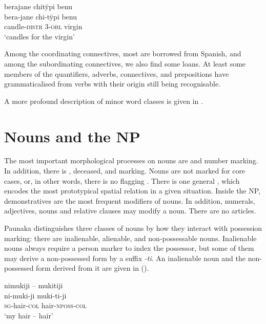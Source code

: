 \ea\label{ex:Sketch-PREP}
\begingl
\glpreamble berajane chitÿpi benu\\
\gla bera-jane chi-tÿpi benu\\
\glb candle-\textsc{distr} 3-\textsc{obl} virgin\\
\glft ‘candles for the virgin’\\
\endgl
\xe
{}

Among the coordinating connectives, most are borrowed from Spanish, and among the subordinating connectives, we also find some loans. At least some members of the quantifiers, adverbs, connectives, and prepositions have grammaticalised from verbs with their origin still being recognisable. 

A more profound description of minor word classes is given in .


\section{Nouns and the NP}\label{sec:O_Nouns}

The most important morphological processes on nouns are  and number marking. In addition, there is , deceased, and  marking. Nouns are not marked for core cases, or, in other words, there is no flagging \citep[cf.][]{Haspelmath2019}. There is one general , which encodes the most prototypical spatial relation in a given situation. Inside the NP, demonstratives are the most frequent modifiers of nouns. In addition, numerals, adjectives, nouns and relative clauses may modify a noun. There are no articles.

Paunaka distinguishes three classes of nouns by how they interact with possession marking: there are inalienable, alienable, and non-possessable nouns. Inalienable nouns always require a person marker to index the possessor, but some of them may derive a non-possessed form by a suffix \textit{-ti}. An inalienable noun and the non-possessed form derived from it are given in ().

\ea\label{ex:Sketch-Inal}
\begingl
\glpreamble nimukiji – mukitiji\\
\gla ni-muki-ji muki-ti-ji\\
\textsc{sg}-hair-\textsc{col} hair-\textsc{nposs}-\textsc{col}\\
\glft ‘my hair – hair’\\
\endgl
\xe

